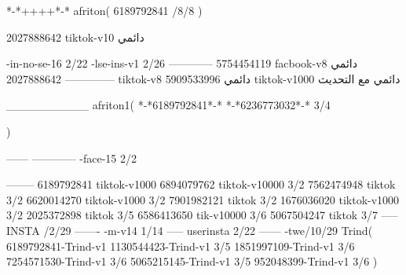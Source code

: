 *-*++++*-*
afriton(
6189792841 /8/8
)

2027888642 tiktok-v10
دائمي

-in-no-se-16 2/22
-lse-ins-v1 2/26
------------
5754454119 facbook-v8
دائمي
--------------
2027888642 tiktok-v8
دائمي
5909533996 tiktok-v1000
دائمي مع التحديث

__________
afriton1(
*-*6189792841*-*
*-*6236773032*-* 3/4

)


------
------------
-face-15 2/2

--------
6189792841 tiktok-v1000
6894079762 tiktok-v10000 3/2
7562474948 tiktok 3/2
6620014270 tiktok-v1000 3/2
7901982121 tiktok 3/2
1676036020 tiktok-v1000 3/2
2025372898 tiktok  3/5
6586413650 tik-v10000 3/6
5067504247 tiktok 3/7
-----
 INSTA /2/29
-------
-m-v14 1/14
-----
userinsta 2/22
------
-twe/10/29
Trind(
6189792841-Trind-v1 
1130544423-Trind-v1 3/5
1851997109-Trind-v1 3/6
7254571530-Trind-v1 3/6
5065215145-Trind-v1 3/5
952048399-Trind-v1 3/6
)
